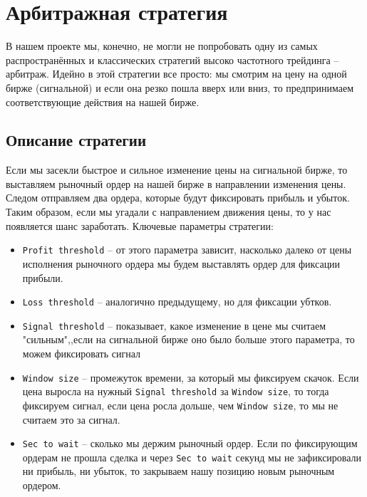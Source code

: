 \section{Арбитражная стратегия}

В нашем проекте мы, конечно, не могли не попробовать одну из самых распространённых и классических стратегий высоко частотного трейдинга -- арбитраж. Идейно в этой стратегии все просто: мы смотрим на цену на одной бирже (сигнальной) и если она резко пошла вверх или вниз, то предпринимаем соответствующие действия на нашей бирже.

\subsection{Описание стратегии}
Если мы засекли быстрое и сильное изменение цены на сигнальной бирже, то выставляем рыночный ордер на нашей бирже в направлении изменения цены. Следом отправляем два ордера, которые будут фиксировать прибыль и убыток. Таким образом, если мы угадали с направлением движения цены, то у нас появляется шанс заработать. Ключевые параметры стратегии:
\begin{itemize}
\item \texttt{Profit threshold} -- от этого параметра зависит, насколько далеко от цены исполнения рыночного ордера мы будем выставлять ордер для фиксации прибыли.
\item \texttt{Loss threshold} -- аналогично предыдущему, но для фиксации убтков.
\item \texttt{Signal threshold} -- показывает, какое изменение в цене мы считаем "сильным",,если на сигнальной бирже оно было больше этого параметра, то можем фиксировать сигнал
\item \texttt{Window size} -- промежуток времени, за который мы фиксируем скачок. Если цена выросла на нужный \texttt{Signal threshold} за \texttt{Window size}, то тогда фиксируем сигнал, если цена росла дольше, чем \texttt{Window size}, то мы не считаем это за сигнал.
\item \texttt{Sec to wait} -- сколько мы держим рыночный ордер. Если по фиксирующим ордерам не прошла сделка и через \texttt{Sec to wait} секунд мы не зафиксировали ни прибыль, ни убыток, то закрываем нашу позицию новым рыночным ордером. 
\end{itemize}




